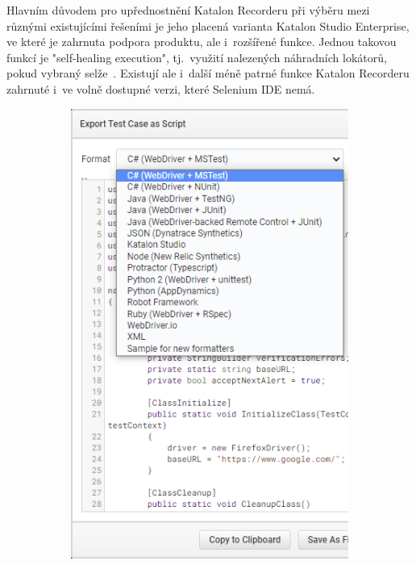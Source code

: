 \documentclass[12pt, a4paper, twoside]{article}
\begin{document}
	Hlavním důvodem pro upřednostnění Katalon Recorderu při výběru mezi různými existujícími řešeními je jeho placená varianta Katalon Studio Enterprise, ve které je zahrnuta podpora produktu, ale i~rozšířené funkce. Jednou takovou funkcí je "self-healing execution", tj.~využití nalezených náhradních lokátorů, pokud vybraný selže~\cite{katalonPricing}. Existují ale i~další méně patrné funkce Katalon Recorderu zahrnuté i~ve volně dostupné verzi, které Selenium IDE nemá.
	\begin{figure}[H]
		\begin{subfigure}[t]{0.6\textwidth}
			\includegraphics[width=1.0\textwidth]{katalonRecorderExport.png}

\end{subfigure}
\end{figure}
\end{document}
